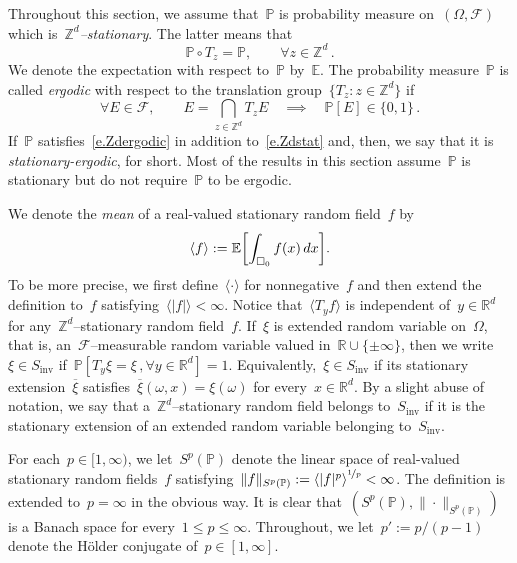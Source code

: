 \documentclass[11pt,twoside]{article} %
\let\oldsquare\square %
\renewcommand{\square}{\oldsquare}
\numberwithin{equation}{section}
\theoremstyle{definition}
\let\originalleft\left
\let\originalright\right
\renewcommand{\left}{\mathopen{}\mathclose\bgroup\originalleft}
\renewcommand{\right}{\aftergroup\egroup\originalright}
\newcommand*{\R}{\ensuremath{\mathbb{R}}}
\newcommand*{\Zd}{\ensuremath{\mathbb{Z}^d}}
\newcommand*{\Rd}{\ensuremath{\mathbb{R}^d}}
\newcommand{\cu}{\square}
\newcommand{\F}{\mathcal{F}}
\renewcommand{\P}{\mathbb{P}}
\newcommand{\E}{\mathbb{E}}
\begin{document}
\smallskip

Throughout this section, we assume that~$\P$ is probability measure on~$(\Omega,\F)$ which is~\emph{$\Zd$--stationary}. The latter means that  
\begin{equation}
\label{e.Zdstat}
\P \circ T_z = \P, \qquad \forall z\in\Zd\,.
\end{equation}
We denote the expectation with respect to~$\P$ by~$\E$. 
The probability measure~$\P$ is called \emph{ergodic} with respect to the translation group~$\{T_z : z\in\Zd\}$ if
\begin{equation}
\label{e.Zdergodic}
\forall E \in\F,
\qquad
E = \bigcap_{z\in \Zd} T_z E 
\quad\implies \quad
\P[E] \in \{0,1\}
\,.
\end{equation}
If~$\P$ satisfies~\eqref{e.Zdergodic} in addition to~\eqref{e.Zdstat} and, then, we say that it is \emph{stationary-ergodic}, for short. Most of the results in this section assume~$\P$ is stationary but do not require~$\P$ to be ergodic. 

\smallskip

We denote the \emph{mean} of a real-valued stationary random field~$f$ by
\begin{equation}
\left\langle f \right\rangle
:=
\E \biggl[ \int_{\cu_0} f(x)\,dx \biggr]. 
\end{equation}
To be more precise, we first define~$\langle \cdot \rangle$ for nonnegative~$f$ and then extend the definition to~$f$ satisfying~$\langle |f| \rangle <\infty$. Notice that~$\langle T_y f \rangle$ is independent of~$y\in\Rd$ for any~$\Zd$--stationary random field~$f$. 
If~$\xi$ is extended random variable on~$\Omega$, that is, an~$\F$--measurable random variable valued in~$\R \cup \{\pm \infty\}$, then we write~$\xi \in S_{\mathrm{inv}}$ if~$\P [ T_y \xi = \xi\,, \forall y\in\Rd ] = 1$. Equivalently,~$\xi \in S_{\mathrm{inv}}$ if its stationary extension~$\overline{\xi}$ satisfies~$\overline{\xi}(\omega,x) = \xi(\omega)$ for every~$x\in\Rd$. By a slight abuse of notation, we say that a~$\Zd$--stationary random field belongs to~$S_{\mathrm{inv}}$ if it is the stationary extension of an extended random variable belonging to~$S_{\mathrm{inv}}$. 

\smallskip

For each~$p\in [1,\infty)$, we let~$S^p(\P)$ denote the linear space of real-valued stationary random fields~$f$ satisfying~$\| f \|_{S^p(\P)} := \left\langle |f|^p \right\rangle^{\nicefrac1p} <\infty$. The definition is extended to~$p=\infty$ in the obvious way. It is clear that~$(S^p(\P), \| \cdot\|_{S^p(\P)})$ is a Banach space for every~$1\leq p \leq \infty$. 
Throughout, we let~$p':=p/(p-1)$ denote the H\"older conjugate of~$p\in[1,\infty]$. 
\end{document}

